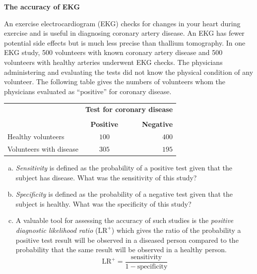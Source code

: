 \documentclass[a4paper, 12pt,twoside]{book}
\begin{document}
  \colorbox{champagne}{\parbox{\textwidth}{
  \textbf{The accuracy of EKG}\vspace{0.3cm}
  
  An exercise electrocardiogram (EKG) checks for changes in your heart during exercise and is useful in diagnosing coronary artery disease. An EKG has fewer potential side effects but is much less precise than thallium tomography. In one EKG study, 500 volunteers with known coronary artery disease and 500 volunteers with healthy arteries underwent EKG checks. The physicians administering and evaluating the tests did not know the physical condition of any volunteer. The following table gives the numbers of volunteers whom the physicians evaluated as  ``positive'' for coronary disease. 
  
        \begin{table}[H]
       \centering
        \begin{tabular}{lcr}
        \hline
        &\multicolumn{2}{c}{\textbf{Test for coronary disease}}\\
        \cline{2-3}\\
        &\textbf{Positive}&\textbf{Negative}\\
        Healthy volunteers&$100$&$400$\\
    Volunteers with disease& $305$ &  $195$\\
    \hline
        \end{tabular}
     \end{table}
  \begin{enumerate}[(a)]
      \item \textit{Sensitivity} is defined as the probability of a positive test given that the subject has disease. What was the sensitivity of this study?
      \item \textit{Specificity} is defined as the probability of a negative test given that the subject is healthy. What was the specificity of this study?
      \item A valuable tool for assessing the accuracy of such studies is the \textit{positive diagnostic likelihood ratio} ($\text{LR}^+$) which gives the ratio of the probability a positive test result will be observed in a diseased person compared to the probability that the same result will be observed in a healthy person.
      $$\text{LR}^+ = \frac{\text{sensitivity}}{1-\text{specificity}}$$
      

\end{enumerate}}}
\end{document}
